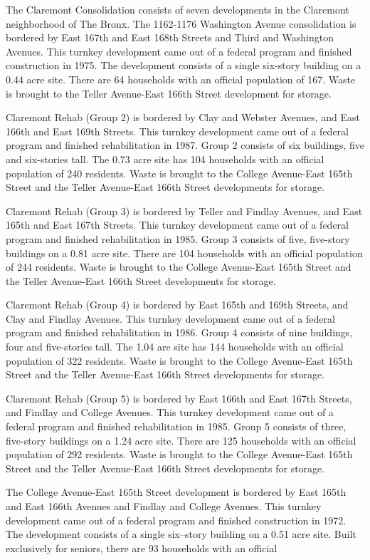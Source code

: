 The Claremont Consolidation consists of seven developments in the Claremont neighborhood of The Bronx. The 1162-1176 Washington Avenue consolidation is bordered by East 167th and East 168th Streets and Third and Washington Avenues. This turnkey development came out of a federal program and finished construction in 1975. The development consists of a single six-story building on a 0.44 acre site. There are 64 households with an official population of 167. Waste is brought to the Teller Avenue-East 166th Street development for storage.\par \vspace{.7\baselineskip}Claremont Rehab (Group 2) is bordered by Clay and Webster Avenues, and East 166th and East 169th Streets. This turnkey development came out of a federal program and finished rehabilitation in 1987. Group 2 consists of six buildings, five and six-stories tall. The 0.73 acre site has 104 households with an official population of 240 residents. Waste is brought to the College Avenue-East 165th Street and the Teller Avenue-East 166th Street developments for storage.\par \vspace{.7\baselineskip}Claremont Rehab (Group 3) is bordered by Teller and Findlay Avenues, and East 165th and East 167th Streets. This turnkey development came out of a federal program and finished rehabilitation in 1985. Group 3 consists of five, five-story buildings on a 0.81 acre site. There are 104 households with an official population of 244 residents. Waste is brought to the College Avenue-East 165th Street and the Teller Avenue-East 166th Street developments for storage.\par \vspace{.7\baselineskip}Claremont Rehab (Group 4) is bordered by East 165th and 169th Streets, and Clay and Findlay Avenues. This turnkey development came out of a federal program and finished rehabilitation in 1986. Group 4 consists of nine buildings, four and five-stories tall. The 1.04 are site has 144 households with an official population of 322 residents. Waste is brought to the College Avenue-East 165th Street and the Teller Avenue-East 166th Street developments for storage.\par \vspace{.7\baselineskip}Claremont Rehab (Group 5) is bordered by East 166th and East 167th Streets, and Findlay and College Avenues. This turnkey development came out of a federal program and finished rehabilitation in 1985. Group 5 consists of three, five-story buildings on a 1.24 acre site. There are 125 households with an official population of 292 residents. Waste is brought to the College Avenue-East 165th Street and the Teller Avenue-East 166th Street developments for storage.\par \vspace{.7\baselineskip}The College Avenue-East 165th Street development is bordered by East 165th and East 166th Avenues and Findlay and College Avenues. This turnkey development came out of a federal program and finished construction in 1972. The development consists of a single six--story building on a 0.51 acre site. Built exclusively for seniors, there are 93 households with an official 